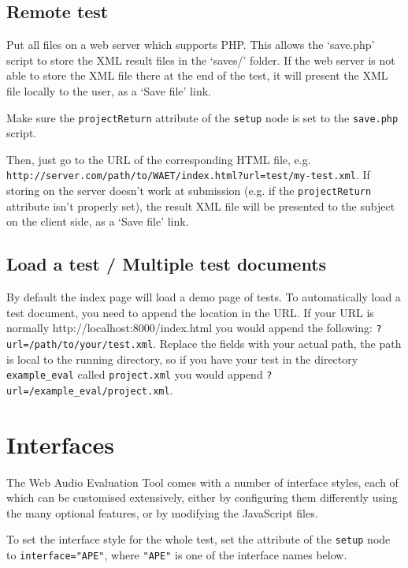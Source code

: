 \documentclass[11pt, oneside]{article}   	%
\begin{document}
	\subsection{Remote test}
		Put all files on a web server which supports PHP. This allows the `save.php' script to store the XML result files in the `saves/' folder. If the web server is not able to store the XML file there at the end of the test, it will present the XML file locally to the user, as a `Save file' link. 

		Make sure the \texttt{projectReturn} attribute of the \texttt{setup} node is set to the \texttt{save.php} script. 

		Then, just go to the URL of the corresponding HTML file, e.g. \texttt{http://server.com/path/to/WAET/index.html?url=test/my-test.xml}. If storing on the server doesn't work at submission (e.g. if the \texttt{projectReturn} attribute isn't properly set), the result XML file will be presented to the subject on the client side, as a `Save file' link. 

    \subsection{Load a test / Multiple test documents}
        By default the index page will load a demo page of tests. To automatically load a test document, you need to append the location in the URL. If your URL is normally http://localhost:8000/index.html you would append the following: \texttt{?url=/path/to/your/test.xml}. Replace the fields with your actual path, the path is local to the running directory, so if you have your test in the directory \texttt{example\_eval} called \texttt{project.xml} you would append \texttt{?url=/example\_eval/project.xml}.

\clearpage

\section{Interfaces}

	The Web Audio Evaluation Tool comes with a number of interface styles, each of which can be customised extensively, either by configuring them differently using the many optional features, or by modifying the JavaScript files. 

	To set the interface style for the whole test, set the attribute of the \texttt{setup} node to \texttt{interface="APE"}, where \texttt{"APE"} is one of the interface names below. 
\end{document}
